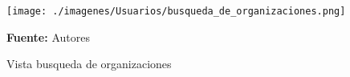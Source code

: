 \begin{figure}[!htb]
  \begin{center}
\texttt{[image: ./imagenes/Usuarios/busqueda\_de\_organizaciones.png]}
    \caption{Vista busqueda de organizaciones}
    \label{fig:Vista_busqueda_de_organizaciones}
    \textbf{Fuente:}  Autores
  \end{center}
\end{figure}
